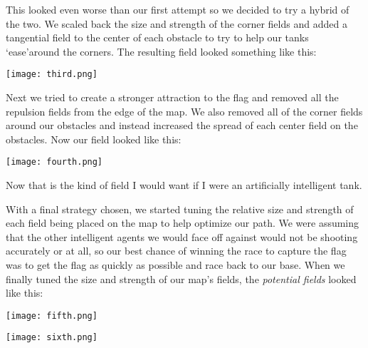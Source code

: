 \par
This looked even worse than our first attempt so we decided to try a hybrid of the two.  We scaled back the size and strength of the corner fields and added a tangential field to the center of each obstacle to try to help our tanks \lq ease\rq around the corners.  The resulting field looked something like this:
\par

\begin{center}
\texttt{[image: third.png]}
\end{center}

\par
Next we tried to create a stronger attraction to the flag and removed all the repulsion fields from the edge of the map.  We also removed all of the corner fields around our obstacles and instead increased the spread of each center field on the obstacles.  Now our field looked like this:
\par

\begin{center}
\texttt{[image: fourth.png]}
\end{center}

\par
Now that is the kind of field I would want if I were an artificially intelligent tank.
\par
With a final strategy chosen, we started tuning the relative size and strength of each field being placed on the map to help optimize our path.  We were assuming that the other intelligent agents we would face off against would not be shooting accurately or at all, so our best chance of winning the race to capture the ﬂag was to get the ﬂag as quickly as possible and race back to our base.  When we finally tuned the size and strength of our map's fields, the \textsl{potential fields} looked like this:
\par

\begin{center}
\texttt{[image: fifth.png]}
\end{center}

\par

\begin{center}
\texttt{[image: sixth.png]}
\end{center}
